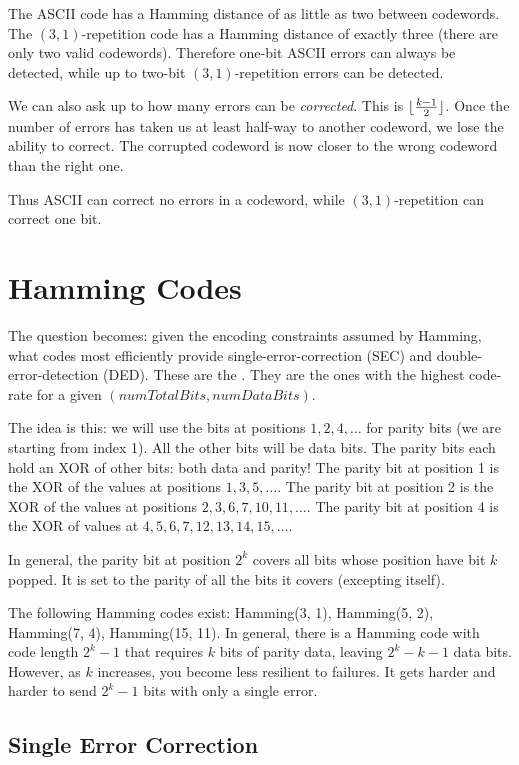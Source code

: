 \documentclass[11pt, oneside]{amsart}
\begin{document}
The ASCII code has a Hamming distance of as little as two between
codewords. The $(3, 1)$-repetition code has a Hamming distance of
exactly three (there are only two valid codewords). Therefore one-bit
ASCII errors can always be detected, while up to two-bit $(3,
1)$-repetition errors can be detected.

We can also ask up to how many errors can be \emph{corrected}. This is
$\lfloor\frac{k-1}{2}\rfloor$. Once the number of errors has taken us at least
half-way to another codeword, we lose the ability to correct. The
corrupted codeword is now closer to the wrong codeword than the right
one.

Thus ASCII can correct no errors in a codeword, while $(3,
1)$-repetition can correct one bit.

\section{Hamming Codes}

The question becomes: given the encoding constraints assumed by Hamming,
what codes most efficiently provide single-error-correction (SEC) and
double-error-detection (DED). These are the . They
are the ones with the highest code-rate for a given
$(\textit{numTotalBits}, \textit{numDataBits})$.

The idea is this: we will use the bits at positions $1, 2, 4, \ldots$
for parity bits (we are starting from index 1). All the other bits will
be data bits. The parity bits each hold an XOR of other bits: both data
and parity! The parity bit at position 1 is the XOR of the values at
positions $1, 3, 5, \ldots$. The parity bit at position 2 is the XOR of
the values at positions $2, 3, 6, 7, 10, 11, \ldots$. The parity bit at
position 4 is the XOR of values at $4, 5, 6, 7, 12, 13, 14, 15, \ldots$.

In general, the parity bit at position $2^k$ covers all bits whose
position have bit $k$ popped. It is set to the parity of all the bits it
covers (excepting itself).

The following Hamming codes exist: Hamming(3, 1), Hamming(5, 2),
Hamming(7, 4), Hamming(15, 11). In general, there is a Hamming code with
code length $2^k - 1$ that requires $k$ bits of parity data, leaving
$2^k - k - 1$ data bits. However, as $k$ increases, you become less
resilient to failures. It gets harder and harder to send $2^k - 1$ bits
with only a single error.

\subsection{Single Error Correction}
\end{document}
